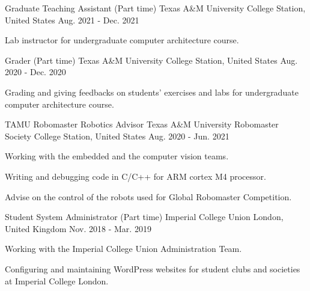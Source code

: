 
\begin{cventries}
  \cventry
    {Graduate Teaching Assistant (Part time)} %
    {Texas A\&M University} %
    {College Station, United States} %
    {Aug. 2021 - Dec. 2021} %
    {
      \begin{cvitems} %
        \item {Lab instructor for undergraduate computer architecture course.}
      \end{cvitems}
    }
    
  \cventry
    {Grader (Part time)} %
    {Texas A\&M University} %
    {College Station, United States} %
    {Aug. 2020 - Dec. 2020} %
    {
      \begin{cvitems} %
        \item {Grading and giving feedbacks on students' exercises and labs for undergraduate computer architecture course.}
      \end{cvitems}
    }
    
  \cventry
    {TAMU Robomaster Robotics Advisor} %
    {Texas A\&M University Robomaster Society} %
    {College Station, United States} %
    {Aug. 2020 - Jun. 2021} %
    {
      \begin{cvitems} %
        \item {Working with the embedded and the computer vision teams.}
        \item {Writing and debugging code in C/C++ for ARM cortex M4 processor.}
        \item {Advise on the control of the robots used for Global Robomaster Competition.}
      \end{cvitems}
    }

  \cventry
    {Student System Administrator (Part time)} %
    {Imperial College Union} %
    {London, United Kingdom} %
    {Nov. 2018 - Mar. 2019} %
    {
      \begin{cvitems} %
        \item {Working with the Imperial College Union Administration Team.}
        \item {Configuring and maintaining WordPress websites for student clubs and societies at Imperial College London.}
      \end{cvitems}
    }


\end{cventries}
